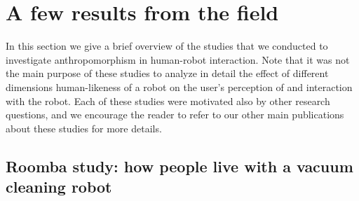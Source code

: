 \documentclass{frontiersSCNS} %
\begin{document}


%
%
%
%
%
%

\section{A few results from the field}
\label{sec:overview-studies}

In this section we give a brief overview of the studies that we conducted to
investigate anthropomorphism in human-robot interaction. Note that it was not
the main purpose of these studies to analyze in detail the effect of different
dimensions human-likeness of a robot on the user's perception of and interaction
with the robot. Each of these studies were motivated also by other research
questions, and we encourage the reader to refer to our other main publications
about these studies for more details.


\subsection{Roomba study: how people live with a vacuum cleaning robot}
\end{document}
